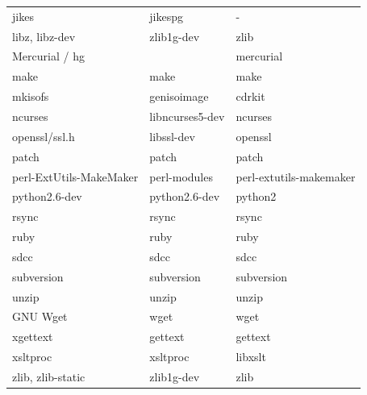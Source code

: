 \documentclass[12pt]{article}
\begin{document}
\begin{tabular}{|l|l|l|}
                jikes                   & jikespg           & -                         \\
                libz, libz-dev          & zlib1g-dev        & zlib                      \\
                Mercurial / hg          &                   & mercurial                 \\
                make                    & make              & make                      \\
                mkisofs                 & genisoimage       & cdrkit                    \\
                ncurses                 & libncurses5-dev   & ncurses                   \\
                openssl/ssl.h           & libssl-dev        & openssl                   \\
                patch                   & patch             & patch                     \\
                perl-ExtUtils-MakeMaker & perl-modules      & perl-extutils-makemaker   \\
                python2.6-dev           & python2.6-dev     & python2                   \\
                rsync                   & rsync             & rsync                     \\
                ruby                    & ruby              & ruby                      \\
                sdcc                    & sdcc              & sdcc                      \\
                subversion              & subversion        & subversion                \\
                unzip                   & unzip             & unzip                     \\
                GNU Wget                & wget              & wget                      \\
                xgettext                & gettext           & gettext                   \\
                xsltproc                & xsltproc          & libxslt                   \\
                zlib, zlib-static       & zlib1g-dev        & zlib                      \\
                \hline
            \end{tabular}
\end{document}
